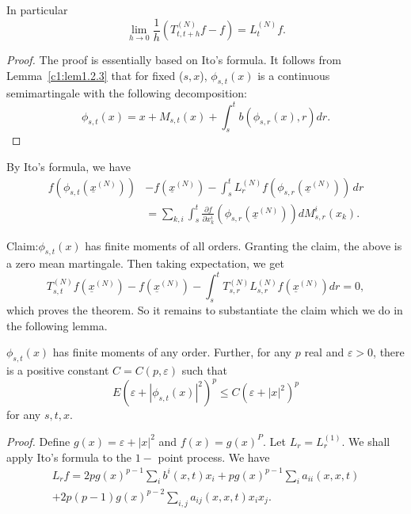In particular
\begin{equation*}
  \lim_{h \rightarrow 0} \frac{1}{h} \left(T^{(N)}_{t,t+h} f- f\right) =
  L^{(N)}_{t} f. \tag{1.2.16}\label{c1:eq1.2.16}   
\end{equation*}

\begin{proof}
  The proof is essentially based on Ito's formula. It follows from
  Lemma~\ref{c1:lem1.2.3} that for fixed ($s,x$), $\phi_{s,t}(x)$ is a
  continuous semimartingale with the following decomposition:  
  \begin{equation*}
    \phi_{s,t}(x) = x+M_{s,t}(x) + \int^t_s 
b(\phi_{s,r}(x),r)dr. \tag{1.2.17}\label{c1:eq1.2.17}
  \end{equation*}
\end{proof}

By Ito's formula, we have 
\begin{align*}
  f(\phi_{s,t}(\underline{x}^{(N)} )) & - f(\underline{x}^{(N)}) -
  \int^t_s L^{(N)}_r f(\phi_{s,r}(\underline{x}^{(N)} )) \, dr \\ 
  & = \sum_{k,i} \int^t_s \frac{\partial f}{\partial x^i_k}
  (\phi_{s,r}(\underline{x}^{(N)} )) dM^i_{s,r} (x_k). 
\tag{1.2.18}\label{c1:eq1.2.18} 
\end{align*}

Claim:\pageoriginale  $\phi_{s,t}(x)$ has finite moments of all orders. Granting the
claim, the above is a zero mean martingale. Then taking expectation,
we get 
$$
T^{(N)}_{s,t}  f(\underline{x}^{(N)}) -f(\underline{x}^{(N)})  - 
\int^t_s T^{(N)}_{s,r} L^{(N)}_{s,r} f(\underline{x}^{(N)})dr = 0, 
$$
which proves the theorem. So it remains to substantiate the claim
which we do in the following lemma. 


\setcounter{Lemma}{5}
\begin{Lemma} %
  $\phi_{s,t}(x)$ has finite moments of any order.  Further, for any
  $p$ real and $\varepsilon > 0$, there is a positive constant $C =
  C(p, \varepsilon)$ such that  
  \begin{equation*} 
    E(\varepsilon + |\phi_{s,t}(x)|^2 )^p \le C(\varepsilon + |x|^2)^p
    \tag{1.2.19}\label{c1:eq1.2.19} 
  \end{equation*}
  for any $s,t,x$.
\end{Lemma}


\noindent\textit{Proof. }
Define $g(x) = \varepsilon + |x|^2$ and $f(x) = g(x)^P$. Let $L_r =
L^{(1)}_r$. We shall apply Ito's formula to the $1-$ point process. We
have  
\begin{multline*}
  L_r f = 2pg(x)^{p-1} \sum_i b^i(x,t)x_i + pg(x)^{p-1}\sum_i
  a_{ii}(x,x,t)\\ 
  + 2p(p-1)g(x)^{p-2} \sum_{i,j} a_{ij}(x,x,t)x_i x_j. \tag*{$\Box$}
\end{multline*}

